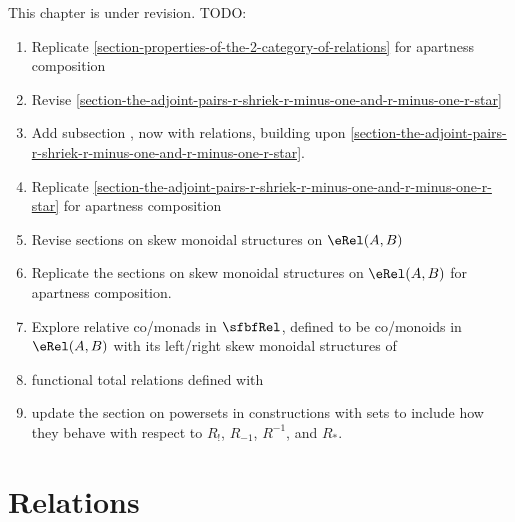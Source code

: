 This chapter is under revision. TODO:
\begin{enumerate}
    \item Replicate \cref{section-properties-of-the-2-category-of-relations} for apartness composition
    \item Revise \cref{section-the-adjoint-pairs-r-shriek-r-minus-one-and-r-minus-one-r-star}
    \item Add subsection , now with relations, building upon \cref{section-the-adjoint-pairs-r-shriek-r-minus-one-and-r-minus-one-r-star}.
    \item Replicate \cref{section-the-adjoint-pairs-r-shriek-r-minus-one-and-r-minus-one-r-star} for apartness composition
    \item Revise sections on skew monoidal structures on $\eRel(A,B)$
    \item Replicate the sections on skew monoidal structures on $\eRel(A,B)$ for apartness composition.
    \item Explore relative co/monads in $\sfbfRel$, defined to be co/monoids in $\eRel(A,B)$ with its left/right skew monoidal structures of 
    \item functional total relations defined with 
    \item update the section on powersets in constructions with sets to include how they behave with respect to $R_{!}$, $R_{-1}$, $R^{-1}$, and $R_{*}$.
\end{enumerate}

\ChapterTableOfContents

\section{Relations}\label{section-relations}
